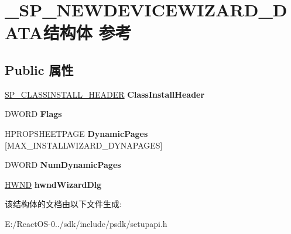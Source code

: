 \hypertarget{struct___s_p___n_e_w_d_e_v_i_c_e_w_i_z_a_r_d___d_a_t_a}{}\section{\+\_\+\+S\+P\+\_\+\+N\+E\+W\+D\+E\+V\+I\+C\+E\+W\+I\+Z\+A\+R\+D\+\_\+\+D\+A\+T\+A结构体 参考}
\label{struct___s_p___n_e_w_d_e_v_i_c_e_w_i_z_a_r_d___d_a_t_a}
\subsection*{Public 属性}
\begin{DoxyCompactItemize}
\item 
\mbox{\label{struct___s_p___n_e_w_d_e_v_i_c_e_w_i_z_a_r_d___d_a_t_a_a7bc4c72b5525e340d8b8ac26222fe54d}} 
\hyperlink{struct___s_p___c_l_a_s_s_i_n_s_t_a_l_l___h_e_a_d_e_r}{S\+P\+\_\+\+C\+L\+A\+S\+S\+I\+N\+S\+T\+A\+L\+L\+\_\+\+H\+E\+A\+D\+ER} {\bfseries Class\+Install\+Header}
\item 
\mbox{\label{struct___s_p___n_e_w_d_e_v_i_c_e_w_i_z_a_r_d___d_a_t_a_a7d9b5c90b9098ba4f0082dcba2aae95c}} 
D\+W\+O\+RD {\bfseries Flags}
\item 
\mbox{\label{struct___s_p___n_e_w_d_e_v_i_c_e_w_i_z_a_r_d___d_a_t_a_af1d57a0a59070e1f8ce76e8e38564896}} 
H\+P\+R\+O\+P\+S\+H\+E\+E\+T\+P\+A\+GE {\bfseries Dynamic\+Pages} \mbox{[}M\+A\+X\+\_\+\+I\+N\+S\+T\+A\+L\+L\+W\+I\+Z\+A\+R\+D\+\_\+\+D\+Y\+N\+A\+P\+A\+G\+ES\mbox{]}
\item 
\mbox{\label{struct___s_p___n_e_w_d_e_v_i_c_e_w_i_z_a_r_d___d_a_t_a_a252010257011fe08063183b3ef2d4374}} 
D\+W\+O\+RD {\bfseries Num\+Dynamic\+Pages}
\item 
\mbox{\label{struct___s_p___n_e_w_d_e_v_i_c_e_w_i_z_a_r_d___d_a_t_a_a79877ebcdd97c441ed4fdb0e0d75490f}} 
\hyperlink{interfacevoid}{H\+W\+ND} {\bfseries hwnd\+Wizard\+Dlg}
\end{DoxyCompactItemize}


该结构体的文档由以下文件生成\+:\begin{DoxyCompactItemize}
\item 
E\+:/\+React\+O\+S-\/0../sdk/include/psdk/setupapi.\+h\end{DoxyCompactItemize}
